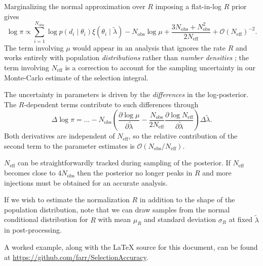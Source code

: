 \documentclass[modern]{aastex62}
\newcommand{\Neff}{N_\mathrm{eff}}
\newcommand{\Nobs}{N_\mathrm{obs}}
\begin{document}
%
Marginalizing the normal approximation over $R$ imposing a flat-in-log $R$ prior
gives
%
\begin{equation}
  \label{eq:fully-marginalized-posterior}
  \log \pi \propto \sum_{i=1}^{\Nobs} \log p\left( d_i \mid \theta_i \right) \xi\left( \theta_i \mid \tilde{\lambda} \right) - \Nobs \log \mu + \frac{3 \Nobs + \Nobs^2}{2 \Neff} + \mathcal{O} \left( \Neff \right)^{-2}.
\end{equation}
%
The term involving $\mu$ would appear in an analysis that ignores the rate $R$
and works entirely with population \emph{distributions} rather than \emph{number
densities} \citep{Mandel2018,Fishbach2018}; the term involving $\Neff$ is a
correction to account for the sampling uncertainty in our Monte-Carlo estimate
of the selection integral.

The uncertainty in parameters is driven by the \emph{differences} in the
log-posterior.  The $R$-dependent terms contribute to such differences through
%
\begin{equation}
  \label{eq:pi-accuracy}
  \Delta \log \pi = \ldots - \Nobs \left( \frac{\partial \log \mu}{\partial \tilde{\lambda}} - \frac{\Nobs}{2 \Neff} \frac{\partial \log \Neff}{\partial \tilde{\lambda}} \right) \Delta \tilde{\lambda}.
\end{equation}
%
Both derivatives are independent of $\Neff$, so the relative contribution of the
second term to the parameter estimates is $\mathcal{O}\left( \Nobs / \Neff
\right)$.

$\Neff$ can be straightforwardly tracked during sampling of the posterior.  If
$\Neff$ becomes close to $4 \Nobs$ then the posterior no longer peaks in $R$ and
more injections must be obtained for an accurate analysis.

If we wish to estimate the normalization $R$ in addition to the shape of the
population distribution, note that we can draw samples from the normal
conditional distribution for $R$ with mean $\mu_R$ and standard deviation
$\sigma_R$ at fixed $\tilde{\lambda}$ in post-processing.

\acknowledgments

A worked example, along with the \LaTeX{} source for this document, can be found
at \url{https://github.com/farr/SelectionAccuracy}.


\end{document}
